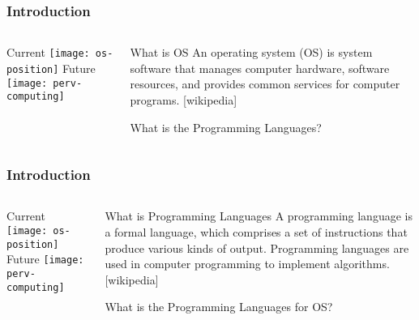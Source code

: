 \begin{frame}[plain]
	\frametitle{Introduction}
	
	
	
	\begin{columns}
		
		\begin{column}{.4\textwidth}
			\centering
			Current
\texttt{[image: os-position]}
Future
\texttt{[image: perv-computing]}
			
		\end{column}
		
		\begin{column}{.6\textwidth}
			
	\begin{block}{What is OS}
	An operating system (OS) is system software that manages computer hardware, software resources, and provides common services for computer programs. [wikipedia]
    \end{block} 
	\LARGE
	What is the Programming Languages?

		\end{column}
		
		
	\end{columns}
	
	
\end{frame}


\begin{frame}[plain]
	\frametitle{Introduction}
	
	
	
	\begin{columns}
		
		\begin{column}{.4\textwidth}
			\centering
			Current
\texttt{[image: os-position]}
Future
\texttt{[image: perv-computing]}
			
		\end{column}
		
		\begin{column}{.6\textwidth}
			
			\begin{block}{What is Programming Languages}
				A programming language is a formal language, which comprises a set of instructions that produce various kinds of output. Programming languages are used in computer programming to implement algorithms. [wikipedia]
			\end{block} 
			\LARGE
			What is the Programming Languages for OS?
			
		\end{column}
		
		
	\end{columns}
	
	
\end{frame}


